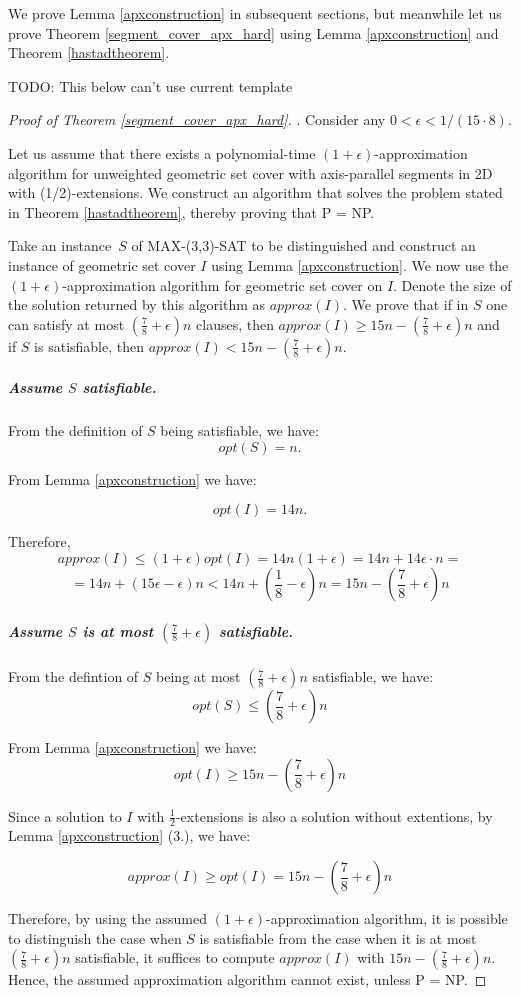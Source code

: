 We prove Lemma \ref{apxconstruction} in
subsequent sections, but meanwhile let us prove
Theorem \ref{segment_cover_apx_hard} using Lemma \ref{apxconstruction}
and Theorem \ref{hastadtheorem}.

TODO: This below can't use current template

\begin{proof}[Proof of Theorem \ref{segment_cover_apx_hard}].
Consider any $0 < \epsilon < 1/(15 \cdot 8)$.

Let us assume that there exists a polynomial-time
$(1+\epsilon)$-approximation algorithm
for unweighted geometric set cover with axis-parallel segments in 2D
with (1/2)-extensions.
We construct an algorithm that solves the problem stated in 
Theorem \ref{hastadtheorem}, thereby proving that P = NP.

Take an instance~$S$ of MAX-(3,3)-SAT to be distinguished
and construct an instance of geometric set cover $I$
using Lemma \ref{apxconstruction}.
We now use the $(1+\epsilon)$-approximation algorithm
for geometric set cover on $I$.
Denote the size of the solution returned by this algorithm as $approx(I)$.
We prove that 
if in $S$
one can satisfy at most $(\frac{7}{8}+\epsilon)n$ clauses,
then $approx(I) \ge 15n - (\frac{7}{8} + \epsilon)n$
and if $S$ is
satisfiable, then $approx(I) < 15n - (\frac{7}{8} + \epsilon)n$.

\subparagraph{Assume $S$ satisfiable.}
From the definition of $S$ being satisfiable, we have:
$$opt(S) = n.$$

From Lemma \ref{apxconstruction} we have:

$$opt(I) = 14n.$$

Therefore,
$$approx(I) \le (1+\epsilon)opt(I) = 14n(1+\epsilon)
	= 14n + 14\epsilon\cdot n =$$ 
	$$= 14n + (15\epsilon - \epsilon)n < 
  14n + \left(\frac{1}{8} - \epsilon\right)n 
= 15n - \left(\frac{7}{8} + \epsilon\right)n$$

\subparagraph{Assume $S$ is at most 
$\left(\frac{7}{8} + \epsilon\right)$ satisfiable.}
From the defintion of $S$ being at most 
$\left(\frac{7}{8} + \epsilon\right)n$ satisfiable, we have:
$$opt(S) \le \left(\frac{7}{8} + \epsilon\right)n$$

From Lemma \ref{apxconstruction} we have:
$$opt(I) \ge 15n - \left(\frac{7}{8} + \epsilon\right)n$$

Since a solution to $I$ with $\frac{1}{2}$-extensions is
also a solution without extentions, by 
Lemma \ref{apxconstruction} (3.), we have:

$$approx(I) \ge opt(I) = 15n - \left(\frac{7}{8} + \epsilon\right)n$$


Therefore, by using the assumed $(1+\epsilon)$-approximation
algorithm,
it is possible to distinguish the case when
$S$ is satisfiable from the case when it is
at most $(\frac{7}{8} + \epsilon)n$ satisfiable,
it suffices to compute $approx(I)$ with $15n - (\frac{7}{8}+\epsilon)n$.
Hence, the assumed approximation algorithm cannot exist, unless P = NP.
\end{proof}

